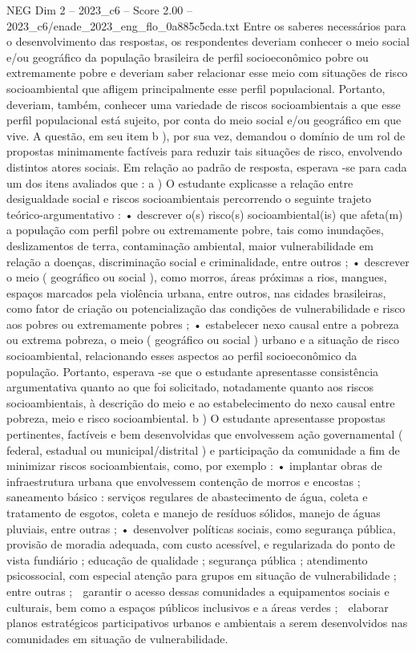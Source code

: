 \begin{textsample}{NEG Dim 2 – 2023\_c6 – Score 2.00 – 2023\_c6/enade\_2023\_eng\_flo\_0a885c5cda.txt}
Entre os saberes necessários para o desenvolvimento das respostas, os respondentes deveriam conhecer o meio social e/ou geográfico da população brasileira de perfil socioeconômico pobre ou extremamente pobre e deveriam saber relacionar esse meio com situações de risco socioambiental que afligem principalmente esse perfil populacional.
Portanto, deveriam, também, conhecer uma variedade de riscos socioambientais a que esse perfil populacional está sujeito, por conta do meio social e/ou geográfico em que vive.
A questão, em seu item b ), por sua vez, demandou o domínio de um rol de propostas minimamente factíveis para reduzir tais situações de risco, envolvendo distintos atores sociais.
Em relação ao padrão de resposta, esperava -se para cada um dos itens avaliados que : a ) O estudante explicasse a relação entre desigualdade social e riscos socioambientais percorrendo o seguinte trajeto teórico-argumentativo : • descrever o(s) risco(s) socioambiental(is) que afeta(m) a população com perfil pobre ou extremamente pobre, tais como inundações, deslizamentos de terra, contaminação ambiental, maior vulnerabilidade em relação a doenças, discriminação social e criminalidade, entre outros ; • descrever o meio ( geográfico ou social ), como morros, áreas próximas a rios, mangues, espaços marcados pela violência urbana, entre outros, nas cidades brasileiras, como fator de criação ou potencialização das condições de vulnerabilidade e risco aos pobres ou extremamente pobres ; • estabelecer nexo causal entre a pobreza ou extrema pobreza, o meio ( geográfico ou social ) urbano e a situação de risco socioambiental, relacionando esses aspectos ao perfil socioeconômico da população.
Portanto, esperava -se que o estudante apresentasse consistência argumentativa quanto ao que foi solicitado, notadamente quanto aos riscos socioambientais, à descrição do meio e ao estabelecimento do nexo causal entre pobreza, meio e risco socioambiental. b ) O estudante apresentasse propostas pertinentes, factíveis e bem desenvolvidas que envolvessem ação governamental ( federal, estadual ou municipal/distrital ) e participação da comunidade a fim de minimizar riscos socioambientais, como, por exemplo : • implantar obras de infraestrutura urbana que envolvessem contenção de morros e encostas ; saneamento básico : serviços regulares de abastecimento de água, coleta e tratamento de esgotos, coleta e manejo de resíduos sólidos, manejo de águas pluviais, entre outras ; • desenvolver políticas sociais, como segurança pública, provisão de moradia adequada, com custo acessível, e regularizada do ponto de vista fundiário ; educação de qualidade ; segurança pública ; atendimento psicossocial, com especial atenção para grupos em situação de vulnerabilidade ; entre outras ;  garantir o acesso dessas comunidades a equipamentos sociais e culturais, bem como a espaços públicos inclusivos e a áreas verdes ;  elaborar planos estratégicos participativos urbanos e ambientais a serem desenvolvidos nas comunidades em situação de vulnerabilidade.

\end{textsample}
